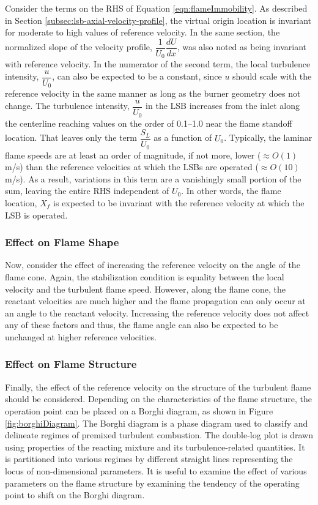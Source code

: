 Consider the terms on the RHS of Equation \ref{eqn:flameImmobility}.
As described in Section \ref{subsec:lsb-axial-velocity-profile}, the virtual origin location is invariant for moderate to high values of reference velocity.
In the same section, the normalized slope of the velocity profile, \(\dfrac{ 1 }{ U_0 } \dfrac{ dU }{ dx }\), was also noted as being invariant with reference velocity.
In the numerator of the second term, the local turbulence intensity, \(\dfrac{ u }{ U_0 }\), can also be expected to be a constant, since \(u\) should scale with the reference velocity in the same manner as long as the burner geometry does not change.
The turbulence intensity, \(\dfrac{ u }{ U_0 }\) in the LSB increases from the inlet along the centerline reaching values on the order of 0.1--1.0 near the flame standoff location.\cite{2008-cheng-a}
That leaves only the term \(\dfrac{ S_L }{ U_0 }\) as a function of \(U_0\).
Typically, the laminar flame speeds are at least an order of magnitude, if not more, lower (\(\approx O(1)\) m/s) than the reference velocities at which the LSBs are operated (\(\approx O(10)\) m/s).
As a result, variations in this term are a vanishingly small portion of the sum, leaving the entire RHS independent of \(U_0\).
In other words, the flame location, \(X_f\) is expected to be invariant with the reference velocity at which the LSB is operated.

\subsubsection{Effect on Flame Shape}

Now, consider the effect of increasing the reference velocity on the angle of the flame cone.
Again, the stabilization condition is equality between the local velocity and the turbulent flame speed.
However, along the flame cone, the reactant velocities are much higher and the flame propagation can only occur at an angle to the reactant velocity.
Increasing the reference velocity does not affect any of these factors and thus, the flame angle can also be expected to be unchanged at higher reference velocities.

\subsubsection{Effect on Flame Structure}



Finally, the effect of the reference velocity on the structure of the turbulent flame should be considered.
Depending on the characteristics of the flame structure, the operation point can be placed on a Borghi diagram, as shown in Figure \ref{fig:borghiDiagram}.
The Borghi diagram\cite{1985-borghi} is a phase diagram used to classify and delineate regimes of premixed turbulent combustion.
The double-log plot is drawn using properties of the reacting mixture and its turbulence-related quantities.
It is partitioned into various regimes by different straight lines representing the locus of non-dimensional parameters.
It is useful to examine the effect of various parameters on the flame structure by examining the tendency of the operating point to shift on the Borghi diagram.

